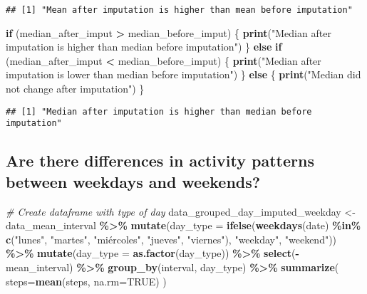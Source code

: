 \documentclass[
]{article}
\newenvironment{Shaded}{\begin{snugshade}}{\end{snugshade}}
\newcommand{\AttributeTok}[1]{\textcolor[rgb]{0.13,0.29,0.53}{#1}}
\newcommand{\CommentTok}[1]{\textcolor[rgb]{0.56,0.35,0.01}{\textit{#1}}}
\newcommand{\ConstantTok}[1]{\textcolor[rgb]{0.56,0.35,0.01}{#1}}
\newcommand{\ControlFlowTok}[1]{\textcolor[rgb]{0.13,0.29,0.53}{\textbf{#1}}}
\newcommand{\FunctionTok}[1]{\textcolor[rgb]{0.13,0.29,0.53}{\textbf{#1}}}
\newcommand{\NormalTok}[1]{#1}
\newcommand{\OtherTok}[1]{\textcolor[rgb]{0.56,0.35,0.01}{#1}}
\newcommand{\SpecialCharTok}[1]{\textcolor[rgb]{0.81,0.36,0.00}{\textbf{#1}}}
\newcommand{\StringTok}[1]{\textcolor[rgb]{0.31,0.60,0.02}{#1}}
\begin{document}
\begin{verbatim}
## [1] "Mean after imputation is higher than mean before imputation"
\end{verbatim}

\begin{Shaded}
\begin{Highlighting}[]
\ControlFlowTok{if}\NormalTok{ (median\_after\_imput }\SpecialCharTok{\textgreater{}}\NormalTok{ median\_before\_imput) \{}
  \FunctionTok{print}\NormalTok{(}\StringTok{"Median after imputation is higher than median before imputation"}\NormalTok{)}
\NormalTok{\} }\ControlFlowTok{else} \ControlFlowTok{if}\NormalTok{ (median\_after\_imput }\SpecialCharTok{\textless{}}\NormalTok{ median\_before\_imput) \{}
  \FunctionTok{print}\NormalTok{(}\StringTok{"Median after imputation is lower than median before imputation"}\NormalTok{)}
\NormalTok{\} }\ControlFlowTok{else}\NormalTok{ \{}
  \FunctionTok{print}\NormalTok{(}\StringTok{"Median did not change after imputation"}\NormalTok{)}
\NormalTok{\}}
\end{Highlighting}
\end{Shaded}

\begin{verbatim}
## [1] "Median after imputation is higher than median before imputation"
\end{verbatim}

\hypertarget{are-there-differences-in-activity-patterns-between-weekdays-and-weekends}{%
\subsection{Are there differences in activity patterns between weekdays
and
weekends?}\label{are-there-differences-in-activity-patterns-between-weekdays-and-weekends}}

\begin{Shaded}
\begin{Highlighting}[]
\CommentTok{\# Create dataframe with type of day}
\NormalTok{data\_grouped\_day\_imputed\_weekday }\OtherTok{\textless{}{-}}\NormalTok{ data\_mean\_interval }\SpecialCharTok{\%\textgreater{}\%} 
  \FunctionTok{mutate}\NormalTok{(}\AttributeTok{day\_type =} \FunctionTok{ifelse}\NormalTok{(}\FunctionTok{weekdays}\NormalTok{(date) }\SpecialCharTok{\%in\%} \FunctionTok{c}\NormalTok{(}\StringTok{"lunes"}\NormalTok{, }\StringTok{"martes"}\NormalTok{, }\StringTok{"miércoles"}\NormalTok{, }\StringTok{"jueves"}\NormalTok{, }\StringTok{"viernes"}\NormalTok{), }\StringTok{"weekday"}\NormalTok{, }\StringTok{"weekend"}\NormalTok{)) }\SpecialCharTok{\%\textgreater{}\%}
  \FunctionTok{mutate}\NormalTok{(}\AttributeTok{day\_type =} \FunctionTok{as.factor}\NormalTok{(day\_type)) }\SpecialCharTok{\%\textgreater{}\%} 
  \FunctionTok{select}\NormalTok{(}\SpecialCharTok{{-}}\NormalTok{mean\_interval) }\SpecialCharTok{\%\textgreater{}\%}
  \FunctionTok{group\_by}\NormalTok{(interval, day\_type) }\SpecialCharTok{\%\textgreater{}\%} 
  \FunctionTok{summarize}\NormalTok{(}
    \AttributeTok{steps=}\FunctionTok{mean}\NormalTok{(steps, }\AttributeTok{na.rm=}\ConstantTok{TRUE}\NormalTok{)}
\NormalTok{  )}
\end{Highlighting}
\end{Shaded}
\end{document}
